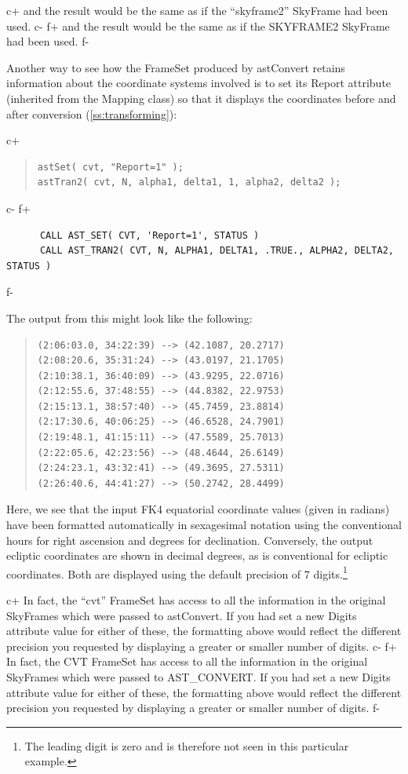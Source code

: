 \documentclass[twoside,11pt]{article}
\newcommand{\secref}[1]{\S\ref{#1}}
\renewcommand{\secref}[1]{\ref{#1}}
\begin{document}
c+
and the result would be the same as if the ``skyframe2'' SkyFrame had
been used.
c-
f+
and the result would be the same as if the SKYFRAME2 SkyFrame had been
used.
f-

Another way to see how the FrameSet produced by astConvert retains
information about the coordinate systems involved is to set its Report
attribute (inherited from the Mapping class) so that it displays the
coordinates before and after conversion (\secref{ss:transforming}):

c+
\begin{quote}
\small
\begin{verbatim}
astSet( cvt, "Report=1" );
astTran2( cvt, N, alpha1, delta1, 1, alpha2, delta2 );
\end{verbatim}
\normalsize
\end{quote}
c-
f+
\small
\begin{verbatim}
      CALL AST_SET( CVT, 'Report=1', STATUS )
      CALL AST_TRAN2( CVT, N, ALPHA1, DELTA1, .TRUE., ALPHA2, DELTA2, STATUS )
\end{verbatim}
\normalsize
f-

The output from this might look like the following:

\begin{quote}
\begin{verbatim}
(2:06:03.0, 34:22:39) --> (42.1087, 20.2717)
(2:08:20.6, 35:31:24) --> (43.0197, 21.1705)
(2:10:38.1, 36:40:09) --> (43.9295, 22.0716)
(2:12:55.6, 37:48:55) --> (44.8382, 22.9753)
(2:15:13.1, 38:57:40) --> (45.7459, 23.8814)
(2:17:30.6, 40:06:25) --> (46.6528, 24.7901)
(2:19:48.1, 41:15:11) --> (47.5589, 25.7013)
(2:22:05.6, 42:23:56) --> (48.4644, 26.6149)
(2:24:23.1, 43:32:41) --> (49.3695, 27.5311)
(2:26:40.6, 44:41:27) --> (50.2742, 28.4499)
\end{verbatim}
\end{quote}

Here, we see that the input FK4 equatorial coordinate values (given in
radians) have been formatted automatically in sexagesimal notation
using the conventional hours for right ascension and degrees for
declination. Conversely, the output ecliptic coordinates are shown in
decimal degrees, as is conventional for ecliptic coordinates. Both are
displayed using the default precision of 7 digits.\footnote{The
leading digit is zero and is therefore not seen in this particular
example.}

c+
In fact, the ``cvt'' FrameSet has access to all the information in the
original SkyFrames which were passed to astConvert. If you had set a
new Digits attribute value for either of these, the formatting above
would reflect the different precision you requested by displaying a
greater or smaller number of digits.
c-
f+
In fact, the CVT FrameSet has access to all the information in the
original SkyFrames which were passed to AST\_CONVERT. If you had set a
new Digits attribute value for either of these, the formatting above
would reflect the different precision you requested by displaying a
greater or smaller number of digits.
f-
\end{document}
